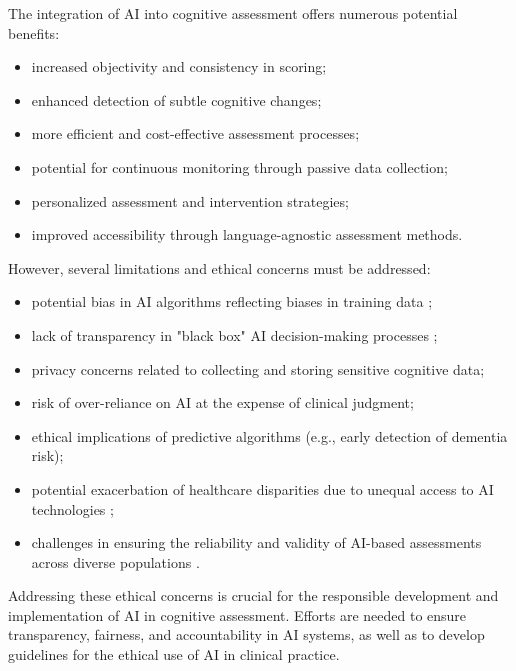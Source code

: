 The integration of AI into cognitive assessment offers numerous potential benefits:
\begin{itemize}
\item increased objectivity and consistency in scoring;
\item enhanced detection of subtle cognitive changes;
\item more efficient and cost-effective assessment processes;
\item potential for continuous monitoring through passive data collection;
\item personalized assessment and intervention strategies;
\item improved accessibility through language-agnostic assessment methods.
\end{itemize}

However, several limitations and ethical concerns must be addressed:
\begin{itemize}
\item potential bias in AI algorithms reflecting biases in training data \cite{Birhane2021};
\item lack of transparency in "black box" AI decision-making processes \cite{Rudin2019};
\item privacy concerns related to collecting and storing sensitive cognitive data;
\item risk of over-reliance on AI at the expense of clinical judgment;
\item ethical implications of predictive algorithms (e.g., early detection of dementia risk);
\item potential exacerbation of healthcare disparities due to unequal access to AI technologies \cite{Obermeyer2019};
\item challenges in ensuring the reliability and validity of AI-based assessments across diverse populations \cite{Gianfrancesco2018}.
\end{itemize}

Addressing these ethical concerns is crucial for the responsible development and implementation of AI in cognitive assessment. Efforts are needed to ensure transparency, fairness, and accountability in AI systems, as well as to develop guidelines for the ethical use of AI in clinical practice.

